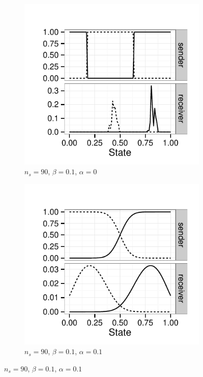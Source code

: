 \documentclass[fleqn,reqno,10pt]{article}
\newcommand{\imprecision}{\ensuremath{\alpha}} %
\newcommand{\toler}{\ensuremath{\beta}} %
\newcommand{\ns}{\ensuremath{n_s}} %
\begin{document}
\begin{figure}
  \centering

  \begin{subfigure}[]{0.45\textwidth}
    \includegraphics[width=\textwidth]{plots/strat_example_ind3098.pdf}
    \caption{$\ns = 90$, $\toler = 0.1$, $\imprecision = 0$}
    \label{fig:example_stratsA}
  \end{subfigure}
  \hfill
  \begin{subfigure}[]{0.45\textwidth}
    \includegraphics[width=\textwidth]{plots/strat_example_ind3452.pdf}
    \caption{$\ns = 90$, $\toler = 0.1$, $\imprecision = 0.1$}
    \label{fig:example_stratsB}
  \end{subfigure}


\end{figure}
\end{document}
